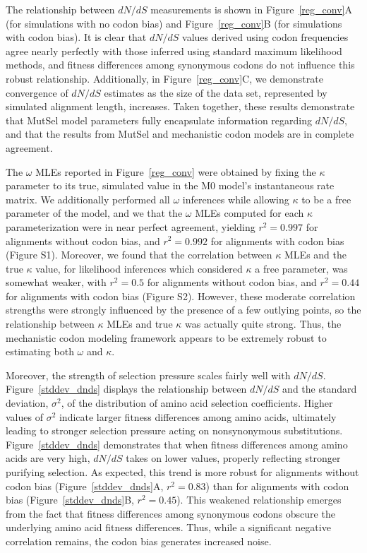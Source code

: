 \documentclass{pnastwo}
\begin{document}
\begin{article}
The relationship between $dN/dS$ measurements is shown in Figure~\ref{reg_conv}A (for simulations with no codon bias) and Figure~\ref{reg_conv}B (for simulations with codon bias). It is clear that $dN/dS$ values derived using codon frequencies agree nearly perfectly with those inferred using standard maximum likelihood methods, and fitness differences among synonymous codons do not influence this robust relationship. Additionally, in Figure~\ref{reg_conv}C, we demonstrate convergence of $dN/dS$ estimates as the size of the data set, represented by simulated alignment length, increases. Taken together, these results demonstrate that MutSel model parameters fully encapsulate information regarding $dN/dS$, and that the results from MutSel and mechanistic codon models are in complete agreement.

The $\omega$ MLEs reported in Figure~\ref{reg_conv} were obtained by fixing the $\kappa$ parameter to its true, simulated value in the M0 model's instantaneous rate matrix. We additionally performed all $\omega$ inferences while allowing $\kappa$ to be a free parameter of the model, and we that the $\omega$ MLEs computed for each $\kappa$ parameterization were in near perfect agreement, yielding $r^2=0.997$ for alignments without codon bias, and $r^2=0.992$ for alignments with codon bias (Figure S1). Moreover, we found that the correlation between $\kappa$ MLEs and the true $\kappa$ value, for likelihood inferences which considered $\kappa$ a free parameter, was somewhat weaker, with $r^2=0.5$ for alignments without codon bias, and $r^2=0.44$ for alignments with codon bias (Figure S2). However, these moderate correlation strengths were strongly influenced by the presence of a few outlying points, so the relationship between $\kappa$ MLEs and true $\kappa$ was actually quite strong. Thus, the mechanistic codon modeling framework appears to be extremely robust to estimating both $\omega$ and $\kappa$.  

Moreover, the strength of selection pressure scales fairly well with $dN/dS$. Figure~\ref{stddev_dnds} displays the relationship between $dN/dS$ and the standard deviation, $\sigma^2$, of the distribution of amino acid selection coefficients. Higher values of $\sigma^2$ indicate larger fitness differences among amino acids, ultimately leading to stronger selection pressure acting on nonsynonymous substitutions. Figure~\ref{stddev_dnds} demonstrates that when fitness differences among amino acids are very high, $dN/dS$ takes on lower values, properly reflecting stronger purifying selection. As expected, this trend is more robust for alignments without codon bias (Figure~\ref{stddev_dnds}A, $r^2 = 0.83$) than for alignments with codon bias (Figure~\ref{stddev_dnds}B, $r^2 = 0.45$). This weakened relationship emerges from the fact that fitness differences among synonymous codons obscure the underlying amino acid fitness differences. Thus, while a significant negative correlation remains, the codon bias generates increased noise.


\end{article}
\end{document}
